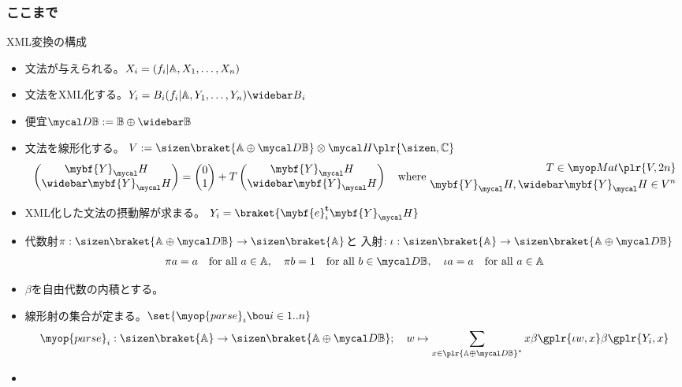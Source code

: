 {\subsubsection{ここまで}\label{s3:ここまで} %
	XML変換の構成
	\begin{itemize}\setlength{\itemsep}{-1mm} %
		\item 文法が与えられる。$X_i=(f_i|\mathbb{A},X_1,\dots,X_n)$
		\item 文法をXML化する。$Y_i=B_i(f_i|\setA,Y_1,\dots,Y_n)\wbar{B}_i$
		\item 便宜$\D\setB:=\setB\oplus\wbar{\setB}$
		\item 文法を線形化する。
		$V:=\sizen\braket{\setA\oplus\D\setB}\otimes\Eta\plr{\sizen,\setC}$
		\begin{equation*}\begin{split}
			\pvec{\mybf{Y}_\Eta}{\wbar{\mybf{Y}}_\Eta}
			= \pvec{0}{1} + T\pvec{\mybf{Y}_\Eta}{\wbar{\mybf{Y}}_\Eta}
			\quad\text{where } \begin{split}
				T\in\Mat\plr{V,2n} \\
				\mybf{Y}_\Eta,\wbar{\mybf{Y}}_\Eta\in V^n
			\end{split}
		\end{split}\end{equation*}
		\item XML化した文法の摂動解が求まる。
		$Y_i=\braket{\mybf{e}_i^\tran\mybf{Y}_\Eta}$
		\item 代数射$\pi:\sizen\braket{\setA\oplus\D\setB}
		\to\sizen\braket{\setA}$と
		入射$:\iota:\sizen\braket{\setA}\to\sizen\braket{\setA\oplus\D\setB}$
		\begin{equation*}\begin{split}
			\pi a = a \quad\text{for all } a\in\setA
			,\quad \pi b = 1 \quad\text{for all } b\in\D\setB
			,\quad \iota a = a \quad\text{for all } a\in\setA
		\end{split}\end{equation*}
		\item $\beta$を自由代数の内積とする。
		\item 線形射の集合が定まる。$\set{\myop{parse}_i\bou i\in1..n}$
		\begin{equation*}\begin{split}
			\myop{parse}_i: \sizen\braket{\setA}
			\to \sizen\braket{\setA\oplus\D\setB}
			;\quad w \mapsto \sum_{x\in\plr{\setA\oplus\D\setB}^*} x
			\beta\gplr{\iota w,x}\beta\gplr{Y_i,x}
		\end{split}\end{equation*}
		\item 

\end{itemize}}
